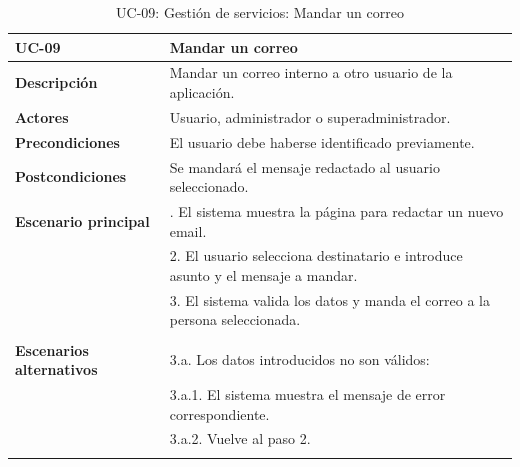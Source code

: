 \begin{table}
  \begin{center}
    \begin{tabularx}{16.4cm}{|l|X|}
      \hline
      \textbf{UC-09} & \textbf{Mandar un correo}\\
      \hline
      \textbf{Descripción} & Mandar un correo interno a otro usuario de la aplicación.\\
      \hline
      \textbf{Actores} & Usuario, administrador o superadministrador.\\
      \hline
      \textbf{Precondiciones} & El usuario debe haberse identificado previamente.\\
      \hline
      \textbf{Postcondiciones} & Se mandará el mensaje redactado al usuario seleccionado.\\
      \hline
      \textbf{Escenario principal} & \smallskip 1. El sistema muestra la página para redactar un nuevo email.\\
      & 2. El usuario selecciona destinatario e introduce asunto y el mensaje a mandar.\\
      & 3. El sistema valida los datos y manda el correo a la persona seleccionada.\\
      & \\
      \hline
      \textbf{Escenarios alternativos} & \smallskip 3.a. Los datos introducidos no son válidos:\\
      & \hspace{0.3cm} 3.a.1. El sistema muestra el mensaje de error correspondiente.\\
      & \hspace{0.3cm} 3.a.2. Vuelve al paso 2.\\
      & \\
      \hline
    \end{tabularx}
    \caption{UC-09: Gestión de servicios: Mandar un correo}
    \label{tab:CU-mandar-correo}
  \end{center}
\end{table}


